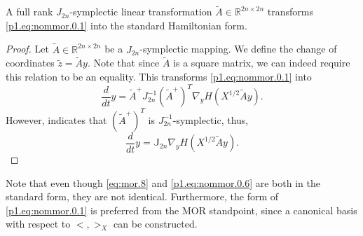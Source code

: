 \begin{lemma} \label{thm:4.2}
A full rank $J_{2n}$-symplectic linear transformation $\tilde A \in \mathbb R^{2n\times 2n}$ transforms \eqref{p1.eq:nommor.0.1} into the standard Hamiltonian form. 
\end{lemma}

\begin{proof}
Let $\tilde A\in \mathbb R^{2n\times 2n}$ be a $J_{2n}$-symplectic mapping. We define the change of coordinates $\tilde z = \tilde Ay$. Note that since $\tilde A$ is a square matrix, we can indeed require this relation to be an equality. This transforms \eqref{p1.eq:nommor.0.1} into
\begin{equation} \label{p1.eq:nommor.0.5}
	\frac{d}{dt} y = \tilde A^+ J_{2n}^{-1} (\tilde A^+)^T \nabla_y H(X^{1/2}\tilde Ay).
\end{equation}
However,  indicates that $(\tilde A^+)^T$ is $J_{2n}^{-1}$-symplectic, thus,
\begin{equation} \label{p1.eq:nommor.0.6}
	\frac{d}{dt} y = \mathbb J_{2n} \nabla_y H(X^{1/2}\tilde Ay).
\end{equation}
\end{proof}
Note that even though \eqref{eq:mor.8} and \eqref{p1.eq:nommor.0.6} are both in the standard form, they are not identical. Furthermore, the form of \eqref{p1.eq:nommor.0.1} is preferred from the MOR standpoint, since a canonical basis with respect to $<,>_X$ can be constructed.

